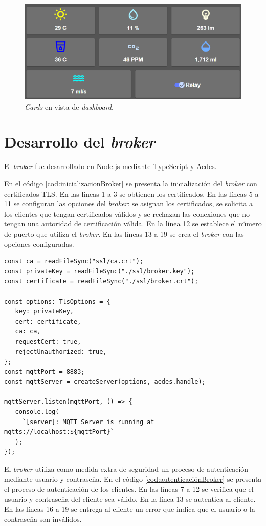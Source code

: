 \begin{figure}[H]
	\centering
	\includegraphics[width=.7\textwidth]{./Figures/Frontend dashboard de zona cards.png}
	\caption{\textit{Cards} en vista de \textit{dashboard}.}
	\label{fig:cardsDashboardDeZona}
\end{figure}

\section{Desarrollo del \emph{broker}}

El \emph{broker} fue desarrollado en Node.js mediante TypeScript y Aedes.

En el código \ref{cod:inicializacionBroker} se presenta la inicialización del \emph{broker} con certificados TLS. En las líneas 1 a 3 se obtienen los certificados. En las líneas 5 a 11 se configuran las opciones del \emph{broker}: se asignan los certificados, se solicita a los clientes que tengan certificados válidos  y se rechazan las conexiones que no tengan una autoridad de certificación \citep{WEBSITE:AUTORIDADDECERTIFICACION} válida. En la línea 12 se establece el número de puerto que utiliza el \emph{broker}. En las líneas 13 a 19 se crea el \emph{broker} con las opciones configuradas.

\begin{lstlisting}[label=cod:inicializacionBroker,caption=Inicialización del \emph{broker} con TLS.]
const ca = readFileSync("ssl/ca.crt");
const privateKey = readFileSync("./ssl/broker.key");
const certificate = readFileSync("./ssl/broker.crt");

const options: TlsOptions = {
   key: privateKey,
   cert: certificate,
   ca: ca,
   requestCert: true,
   rejectUnauthorized: true,
};
const mqttPort = 8883;
const mqttServer = createServer(options, aedes.handle);

mqttServer.listen(mqttPort, () => {
   console.log(
     `[server]: MQTT Server is running at mqtts://localhost:${mqttPort}`
   );
});
\end{lstlisting}

El \emph{broker} utiliza como medida extra de seguridad un proceso de autenticación mediante usuario y contraseña. En el código \ref{cod:autenticaciónBroker} se presenta el proceso de autenticación de los clientes. En las líneas 7 a 12 se verifica que el usuario y contraseña del cliente sea válido. En la línea 13 se autentica al cliente. En las líneas 16 a 19 se entrega  al cliente un error que indica que el usuario o la contraseña son inválidos.

